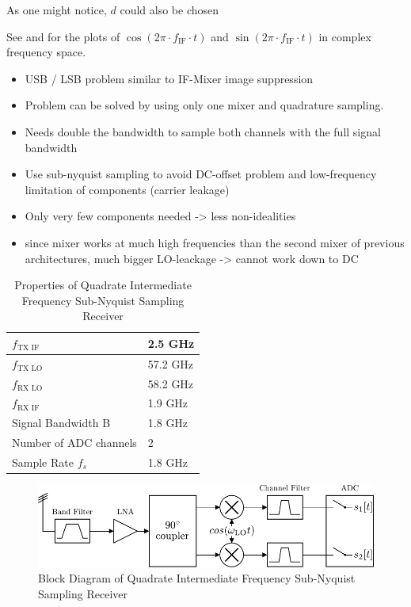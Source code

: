 As one might notice, $d$ could also be chosen


See  and 
for the plots of $\cos(2\pi \cdot f_{\text{IF}} \cdot t)$
and $\sin(2\pi \cdot f_{\text{IF}} \cdot t)$ in complex frequency space. \\

\begin{itemize}
\item USB / LSB problem similar to IF-Mixer image suppression
\item Problem can be solved by using only one mixer and quadrature sampling.
\item Needs double the bandwidth to sample both channels with the full
  signal bandwidth
\item Use sub-nyquist sampling to avoid DC-offset problem and low-frequency
  limitation of components (carrier leakage)
\item Only very few components needed -> less non-idealities
\item since mixer works at much high frequencies than the second mixer of
  previous architectures, much bigger LO-leackage -> cannot work down to DC
\end{itemize}

\begin{table}[h]
  \centering
  \begin{tabular}{|l|l|}
    \hline
    $f_{\text{TX IF}}$ & 2.5 GHz \\ \hline
    $f_{\text{TX LO}}$ & 57.2 GHz \\ \hline
    $f_{\text{RX LO}}$ & 58.2 GHz \\ \hline
    $f_{\text{RX IF}}$ & 1.9 GHz \\ \hline
    Signal Bandwidth B & 1.8 GHz \\ \hline
    Number of \gls{ADC} channels & 2 \\ \hline
    Sample Rate $f_s$ & 1.8 GHz \\ \hline
  \end{tabular}
  \caption{Properties of Quadrate Intermediate Frequency
    Sub-Nyquist Sampling Receiver}
  \label{tab:rx_2}
\end{table}

\begin{figure}[h!]
  \centering
  \includegraphics[width=\textwidth]{figures/quad_if_rx_block_diagram}
  \caption{Block Diagram of Quadrate Intermediate Frequency Sub-Nyquist Sampling Receiver}
  \label{fig:rx_2_bd}
\end{figure}

